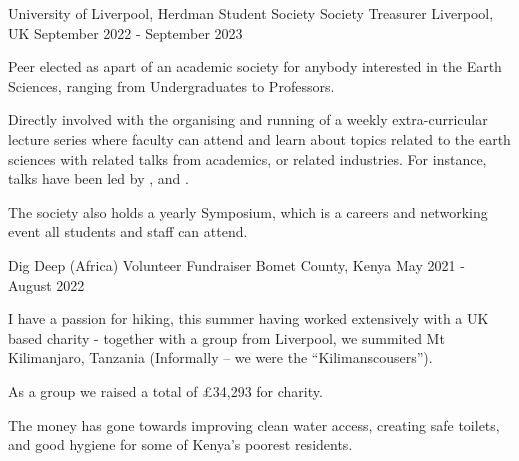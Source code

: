 



\begin{cventries}

  \cventry
    {University of Liverpool, Herdman Student Society} %
    {Society Treasurer} %
    {Liverpool, UK} %
    {September 2022 - September 2023} %
    {
      \begin{cvitems} %
        \item {Peer elected as apart of an academic society for anybody interested in the Earth Sciences, ranging from Undergraduates to Professors.}
        \item {Directly involved with the organising and running of a weekly extra-curricular lecture series where faculty can attend and learn about topics related to the earth sciences with related talks from academics, or related industries. For instance, talks have been led by \href{https://tektonik.co.uk/}{\color{darkblue}{Tektonik Consulting Ltd}}, and \href{https://rskgroup.com/}{\color{darkblue}{RSK}}.
        }
        \item {The society also holds a yearly Symposium, which is a careers and networking event all students and staff can attend.}
      \end{cvitems}
    }

  \cventry
    {Dig Deep  (Africa)} %
    {Volunteer Fundraiser } %
    {Bomet County, Kenya} %
    {May 2021 - August 2022} %
    {
      \begin{cvitems} %
        \item {I have a passion for hiking, this summer having worked extensively with a UK based charity \href{https://www.digdeep.org.uk/}{\color{darkblue}{(Dig Deep)}} - together with a group from Liverpool, we summited Mt Kilimanjaro, Tanzania (Informally – we were the “Kilimanscousers”).}
        \item {As a group we raised a total of £34,293 for charity.}
        \item {The money has gone towards improving clean water access, creating safe toilets, and good hygiene for some of Kenya’s poorest residents.}
      \end{cvitems}
    }


\end{cventries}
